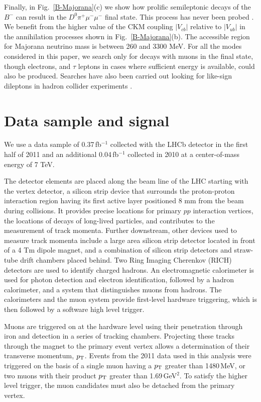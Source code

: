 \documentclass[12pt,a4paper]{article}
\begin{document}
Finally, in Fig.~\ref{B-Majorana}(c) we show how prolific semileptonic decays of the $B^-$ can result in the $D^0\pi^+\mu^-\mu^-$ final state. 
This process has never been probed \cite{Quintero:2011yh}.
We benefit from the higher value of the CKM coupling $|V_{cb}|$ relative to  $|V_{ub}|$ in the annihilation processes shown in  Fig.~\ref{B-Majorana}(b).
The accessible region for Majorana neutrino mass is between 260 and 3300 MeV. For all the modes considered in this paper, we search only for decays with muons in the final state, though electrons, and $\tau$ leptons in cases where sufficient energy is available, could also be produced.
Searches have also been carried out looking for like-sign dileptons in hadron collider experiments \cite{Aad:2011vj,*Chatrchyan:2011wba,*Abulencia:2007rd,*Acosta:2004kx}.


\section{Data sample and signal}
We use a data sample of 0.37\,fb$^{-1}$ collected with the LHCb detector  \cite{LHCb-det} in the first half of 2011 and an additional
0.04\,fb$^{-1}$ collected in 2010 at a center-of-mass energy of 7 TeV. 

The detector elements are placed along the beam line of the LHC starting with the vertex detector, a silicon strip device that surrounds the proton-proton interaction region having its first active layer positioned 8 mm from the beam during collisions. It provides precise locations for primary $pp$ interaction vertices, the locations of decays of long-lived particles, and contributes to the measurement of track momenta. Further downstream, other devices used to measure track momenta include a large area silicon strip detector located in front of a 4 Tm dipole magnet, and a combination of
silicon strip detectors and straw-tube drift chambers placed behind. Two Ring Imaging Cherenkov (RICH) detectors are used to identify charged hadrons. An electromagnetic calorimeter is used for photon detection and electron identification, followed by a hadron calorimeter, and  a system that distinguishes muons from hadrons. The calorimeters and the muon system provide first-level hardware triggering, which is then followed by a software high level trigger.

Muons are triggered on at the hardware level using their penetration through iron and detection in a series of tracking chambers. Projecting these tracks through the magnet to the primary event vertex allows a determination of their  transverse momentum, $p_{\rm T}$. Events from the 2011 data used in this analysis were triggered on the basis of a single muon having a $p_{\rm T}$ greater than 1480\,MeV, or two muons with their product $p_{\rm T}$ greater than 1.69\,GeV$^{2}$.  To satisfy the higher level trigger, the muon candidates must also be detached from the primary vertex. 
\end{document}
